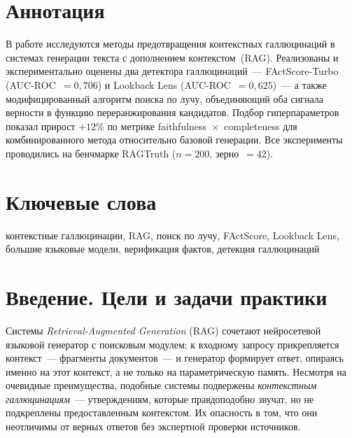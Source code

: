 \documentclass[a4paper,12pt]{extarticle}
\begin{document}

\newpage
\setcounter{page}{2}

{
  \hypersetup{linkcolor=black}
  \tableofcontents
}

\newpage

\section*{Аннотация}

В работе исследуются методы предотвращения контекстных галлюцинаций в системах
генерации текста с дополнением контекстом~(RAG). Реализованы и экспериментально
оценены два детектора галлюцинаций~--- FActScore-Turbo (AUC-ROC~$=0{,}706$)
и Lookback Lens (AUC-ROC~$=0{,}625$)~--- а также модифицированный алгоритм поиска
по лучу, объединяющий оба сигнала верности в функцию переранжирования кандидатов.
Подбор гиперпараметров показал прирост $+12\%$ по метрике
faithfulness~$\times$~completeness для комбинированного метода относительно
базовой генерации. Все эксперименты проводились на бенчмарке RAGTruth
($n=200$, зерно~$=42$).

\section*{Ключевые слова}

контекстные галлюцинации, RAG, поиск по лучу, FActScore, Lookback Lens,
большие языковые модели, верификация фактов, детекция галлюцинаций

\pagebreak

\section{Введение. Цели и задачи практики}
\label{sec:intro}

Системы \textit{Retrieval-Augmented Generation} (RAG) сочетают нейросетевой
языковой генератор с поисковым модулем: к входному запросу прикрепляется
контекст~--- фрагменты документов~--- и генератор формирует ответ, опираясь
именно на этот контекст, а не только на параметрическую память.
Несмотря на очевидные преимущества, подобные системы подвержены
\textit{контекстным галлюцинациям}~--- утверждениям, которые правдоподобно
звучат, но не подкреплены предоставленным контекстом.
Их опасность в том, что они неотличимы от верных ответов без экспертной
проверки источников.
\end{document}
